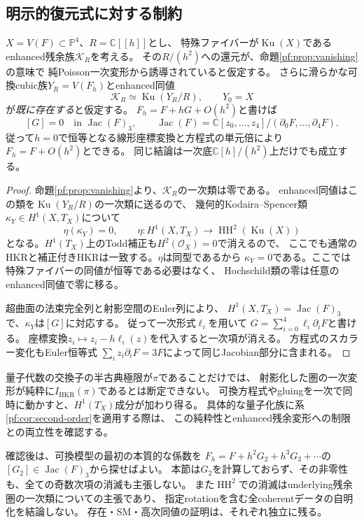\subsection{明示的復元式に対する制約}
\begin{corollary}[可換復元先の方程式は一次で動かない]
\label{pf:cor:second-order}
$X=V(F)\subset\mathbb P^4$、$R=\mathbb C[[h]]$とし、
特殊ファイバーが$\operatorname{Ku}(X)$であるenhanced残余族$\mathcal K_R$を考える。
その$R/(h^2)$への還元が、命題\ref{pf:prop:vanishing}の意味で
純Poisson一次変形から誘導されていると仮定する。
さらに滑らかな可換cubic族$Y_R=V(F_h)$とenhanced同値
\[
 \mathcal K_R\simeq\operatorname{Ku}(Y_R/R),\qquad Y_0=X
\]
が\emph{既に存在する}と仮定する。
$F_h=F+hG+O(h^2)$と書けば
\[
 [G]=0\quad\text{in }
 \operatorname{Jac}(F)_3,
 \qquad \operatorname{Jac}(F)=\mathbb C[z_0,\ldots,z_4]/(\partial_0F,\ldots,\partial_4F).
 \tag{T0}\label{pf:eq:tangent-zero}
\]
従って$h=0$で恒等となる線形座標変換と方程式の単元倍により
$F_h=F+O(h^2)$とできる。
同じ結論は一次底$\mathbb C[h]/(h^2)$上だけでも成立する。
\end{corollary}
\begin{proof}
命題\ref{pf:prop:vanishing}より、$\mathcal K_R$の一次類は零である。
enhanced同値はこの類を$\operatorname{Ku}(Y_R/R)$の一次類に送るので、
幾何的Kodaira--Spencer類$\kappa_Y\in H^1(X,T_X)$について
\[
 \eta(\kappa_Y)=0,\qquad
 \eta:H^1(X,T_X)\longrightarrow\operatorname{HH}^2(\operatorname{Ku}(X))
\]
となる。$H^1(T_X)$上のTodd補正も$H^2(\mathcal O_X)=0$で消えるので、
ここでも通常のHKRと補正付きHKRは一致する。$\eta$は同型\cite[Theorem 4.4(2)]{JLLZ}であるから
$\kappa_Y=0$である。ここでは特殊ファイバーの同値が恒等である必要はなく、
Hochschild類の零は任意のenhanced同値で零に移る。

超曲面の法束完全列と射影空間のEuler列により、
$H^1(X,T_X)=\operatorname{Jac}(F)_3$で、$\kappa_Y$は$[G]$に対応する。
従って一次形式$\ell_i$を用いて
$G=\sum_{i=0}^4\ell_i\partial_iF$と書ける。
座標変換$z_i\mapsto z_i-h\ell_i(z)$を代入すると一次項が消える。
方程式のスカラー変化もEuler恒等式
$\sum_i z_i\partial_iF=3F$によって同じJacobian部分に含まれる。
\end{proof}

\begin{remark}[一次消滅の適用条件と高次項]
\label{pf:rem:scope}
量子代数の交換子の半古典極限が$\pi$であることだけでは、
射影化した圏の一次変形が純粋に$I_{\mathrm{HKR}}(\pi)$であるとは断定できない。
可換方程式やgluingを一次で同時に動かすと、$H^1(T_X)$成分が加わり得る。
具体的な量子化族に系\ref{pf:cor:second-order}を適用する際は、
この純粋性とenhanced残余変形への制限との両立性を確認する。

確認後は、可換模型の最初の本質的な係数を
$F_h=F+h^2G_2+h^3G_3+\cdots$の$[G_2]\in\operatorname{Jac}(F)_3$から探せばよい。
本節は$G_2$を計算しておらず、その非零性も、全ての奇数次項の消滅も主張しない。
また$\operatorname{HH}^2$での消滅はunderlying残余圏の一次類についての主張であり、
指定rotationを含む全coherentデータの自明化を結論しない。
存在・SM・高次同値の証明は、それぞれ独立に残る。
\end{remark}